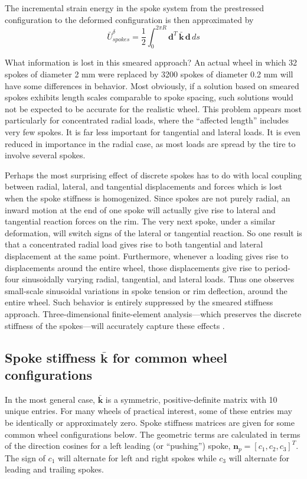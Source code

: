 \documentclass[\rootdir/thesis.tex]{subfiles}
\begin{document}
The incremental strain energy in the spoke system from the prestressed configuration to the deformed configuration is then approximated by
\begin{equation}
\label{eq:dU_spokes_cont}
\bar{U}_{spokes}^{\delta} = \frac{1}{2}\int_0^{2\pi R} \mathbf{d}^T\, \mathbf{\bar{k}}\, \mathbf{d} \, ds
\end{equation}

What information is lost in this smeared approach? An actual wheel in which 32 spokes of diameter 2 mm were replaced by 3200 spokes of diameter 0.2 mm will have some differences in behavior. Most obviously, if a solution based on smeared spokes exhibits length scales comparable to spoke spacing, such solutions would not be expected to be accurate for the realistic wheel. This problem appears most particularly for concentrated radial loads, where the ``affected length'' includes very few spokes. It is far less important for tangential and lateral loads. It is even reduced in importance in the radial case, as most loads are spread by the tire to involve several spokes.

Perhaps the most surprising effect of discrete spokes has to do with local coupling between radial, lateral, and tangential displacements and forces which is lost when the spoke stiffness is homogenized. Since spokes are not purely radial, an inward motion at the end of one spoke will actually give rise to lateral and tangential reaction forces on the rim. The very next spoke, under a similar deformation, will switch signs of the lateral or tangential reaction. So one result is that a concentrated radial load gives rise to both tangential and lateral displacement at the same point. Furthermore, whenever a loading gives rise to displacements around the entire wheel, those displacements give rise to period-four sinusoidally varying radial, tangential, and lateral loads. Thus one observes small-scale sinusoidal variations in spoke tension or rim deflection, around the entire wheel. Such behavior is entirely suppressed by the smeared stiffness approach. Three-dimensional finite-element analysis---which preserves the discrete stiffness of the spokes---will accurately capture these effects \cite{Salamon1992}.

\subsection{Spoke stiffness $\bar{\mathbf{k}}$ for common wheel configurations}

In the most general case, $\bar{\mathbf{k}}$ is a symmetric, positive-definite matrix with 10 unique entries. For many wheels of practical interest, some of these entries may be identically or approximately zero. Spoke stiffness matrices are given for some common wheel configurations below. The geometric terms are calculated in terms of the direction cosines for a left leading (or ``pushing'') spoke, $\mathbf{n}_p = [c_1, c_2, c_3]^T$. The sign of $c_1$ will alternate for left and right spokes while $c_3$ will alternate for leading and trailing spokes.
\end{document}
